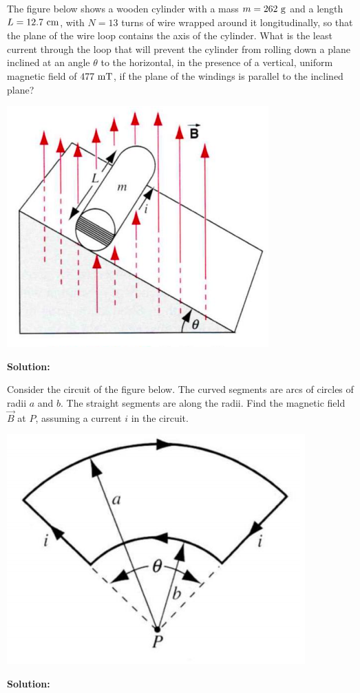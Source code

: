 \documentclass[11pt]{article}
\begin{document}
\begin{problem}[(P32.19)]
The figure below shows a wooden cylinder with a mass $m=262~\mathrm{g}$ and a length $L=12.7~\mathrm{cm}$, with $N=13$ turns of wire wrapped around it longitudinally, so
that the plane of the wire loop contains the axis of the cylinder. What is the least current through the loop that will prevent the cylinder from rolling down a plane inclined at an angle $\theta$ to the horizontal, in the presence of a vertical, uniform magnetic field of $477~\mathrm{mT}$, if the plane of the windings is parallel to the inclined plane?
\begin{center}
\includegraphics[scale=0.4]{prob4.png}
\end{center}
\end{problem}


\textbf{Solution:}\\

\clearpage

\begin{problem}[\P(E33.13)]
Consider the circuit of the figure below. The curved segments are arcs of circles of radii $a$ and $b$. The straight segments are along the radii. Find the magnetic field $\vec{B}$ at
$P$, assuming a current $i$ in the circuit.
\begin{center}
\includegraphics[scale=0.4]{prob5.png}
\end{center}
\end{problem}


\textbf{Solution:}\\

\clearpage
\end{document}
